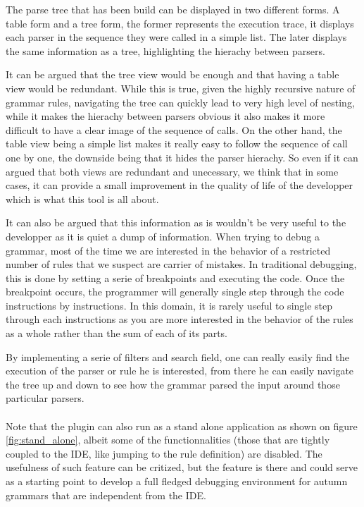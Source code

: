 	The parse tree that has been build can be displayed in two different forms. A table form and a tree form, the former represents the execution trace, it displays each parser in the sequence they were called in a simple list. The later displays the same information as a tree, highlighting the hierachy between parsers.

	\bigskip

	It can be argued that the tree view would be enough and that having a table view would be redundant. While this is true, given the highly recursive nature of grammar rules, navigating the tree can quickly lead to very high level of nesting, while it makes the hierachy between parsers obvious it also makes it more difficult to have a clear image of the sequence of calls. On the other hand, the table view being a simple list makes it really easy to follow the sequence of call one by one, the downside being that it hides the parser hierachy. So even if it can argued that both views are redundant and unecessary, we think that in some cases, it can provide a small improvement in the quality of life of the developper which is what this tool is all about.

	\bigskip

	It can also be argued that this information as is wouldn't be very useful to the developper as it is quiet a dump of information. When trying to debug a grammar, most of the time we are interested in the behavior of a restricted number of rules that we suspect are carrier of mistakes. In traditional debugging, this is done by setting a serie of breakpoints and executing the code. Once the breakpoint occurs, the programmer will generally single step through the code instructions by instructions. In this domain, it is rarely useful to single step through each instructions as you are more interested in the behavior of the rules as a whole rather than the sum of each of its parts.

	\bigskip

	By implementing a serie of filters and search field, one can really easily find the execution of the parser or rule he is interested, from there he can easily navigate the tree up and down to see how the grammar parsed the input around those particular parsers. 

	\paragraph{}

	Note that the plugin can also run as a stand alone application as shown on figure \ref{fig:stand_alone}, albeit some of the functionnalities (those that are tightly coupled to the IDE, like jumping to the rule definition) are disabled. The usefulness of such feature can be critized, but the feature is there and could serve as a starting point to develop a full fledged debugging environment for autumn grammars that are independent from the IDE. 

